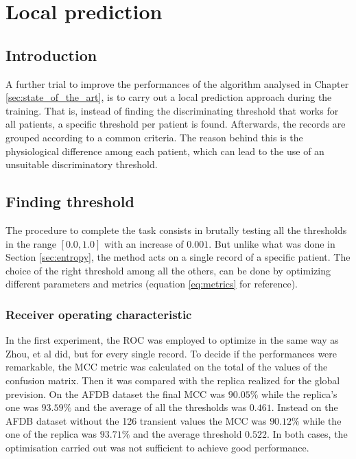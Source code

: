 \chapter{Local prediction}
\label{sec:local}

\section{Introduction}
A further trial to improve the performances of the algorithm analysed in Chapter \ref{sec:state_of_the_art}, is to carry out a local prediction approach during the training. That is, instead of finding the discriminating threshold that works for all patients, a specific threshold per patient is found. Afterwards, the records are grouped according to a common criteria. The reason behind this is the physiological difference among each patient, which can lead to the use of an unsuitable discriminatory threshold.

\section{Finding threshold}
The procedure to complete the task consists in brutally testing all the thresholds in the range $[0.0,1.0]$ with an increase of $0.001$. But unlike what was done in Section \ref{sec:entropy}, the method acts on a single record of a specific patient. The choice of the right threshold among all the others, can be done by optimizing different parameters and metrics (equation \ref{eq:metrics} for reference).

\subsection{Receiver operating characteristic}
In the first experiment, the ROC was employed to optimize in the same way as Zhou, et al\cite{zhou2015} did, but for every single record. To decide if the performances were remarkable, the MCC metric was calculated on the total of the values of the confusion matrix. Then it was compared with the replica realized for the global prevision. On the AFDB dataset the final MCC was $90.05\%$ while the replica's one was $93.59\%$ and the average of all the thresholds was $0.461$. Instead on the AFDB dataset without the 126 transient values the MCC was $90.12\%$ while the one of the replica was $93.71\%$ and the average threshold $0.522$. In both cases, the optimisation carried out was not sufficient to achieve good performance.

